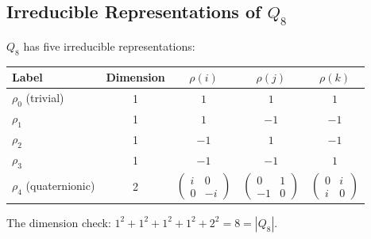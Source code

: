 \subsection{Irreducible Representations of $Q_8$}
  \label{subsec:irreducible-representations-of-q_8}

  $Q_8$ has five irreducible representations:
  \begin{center}
    \begin{tabular}{lcccc}
      \hline
      Label              & Dimension & $\rho(i)$ & $\rho(j)$ & $\rho(k)$ \\
      \hline
      $\rho_0$ (trivial) & 1         & $1$       & $1$       & $1$       \\
      $\rho_1$           & 1         & $1$       & $-1$      & $-1$      \\
      $\rho_2$           & 1         & $-1$      & $1$       & $-1$      \\
      $\rho_3$           & 1         & $-1$      & $-1$      & $1$       \\
      $\rho_4$ (quaternionic) & 2 &
      $\begin{pmatrix}
         i&0\\0&-i
      \end{pmatrix}$ &
      $\begin{pmatrix}
         0&1\\-1&0
      \end{pmatrix}$ &
      $\begin{pmatrix}
         0&i\\i&0
      \end{pmatrix}$ \\
      \hline
    \end{tabular}
  \end{center}
  The dimension check:
  $1^2 + 1^2 + 1^2 + 1^2 + 2^2 = 8 = |Q_8|$.
